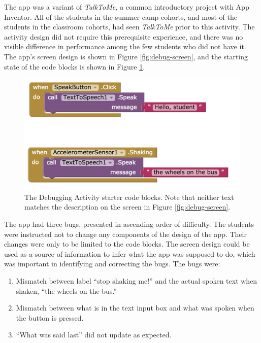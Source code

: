 The app was a variant of \emph{TalkToMe,} a common introductory project with App Inventor. All of the students in the summer camp cohorts, and most of the students in the classroom cohorts, had seen \emph{TalkToMe} prior to this activity. The activity design did not require this prerequisite experience, and there was no visible difference in performance among the few students who did not have it. The app's screen design is shown in Figure \ref{fig:debug-screen}, and the starting state of the code blocks is shown in Figure \ref{fig:debug0}.

\begin{figure}
  \centering
      \includegraphics[width=\textwidth]{images/debugActivity/debug0start}
  \caption[The Debugging Activity Starter Code Blocks]{The Debugging Activity starter code blocks. Note that neither text matches the description on the screen in Figure \ref{fig:debug-screen}.}
  \label{fig:debug0}
\end{figure}


The app had three bugs, presented in ascending order of difficulty. The students were instructed not to change any components of the design of the app. Their changes were only to be limited to the code blocks. The screen design could be used as a source of information to infer what the app was supposed to do, which was important in identifying and correcting the bugs. The bugs were:

\begin{enumerate}
\item Mismatch between label ``stop shaking me!'' and the actual spoken text when shaken, ``the wheels on the bus.''
\item Mismatch between what is in the text input box and what was spoken when the button is pressed.
\item ``What was said last'' did not update as expected.
\end{enumerate}

